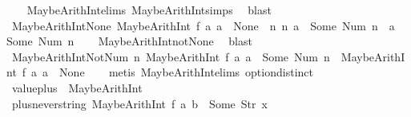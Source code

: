 \begin{isabellebody}
%
\isadelimproof
\ \ %
\endisadelimproof
%
\isatagproof
{}\isamarkupfalse%
\ MaybeArithInt{\isachardot}elims\ MaybeArithInt{\isachardot}simps{\isacharparenleft}{}{\isacharparenright}\ \isamarkupfalse%
\ blast%
\endisatagproof
{\isafoldproof}%
%
\isadelimproof
\isanewline
%
\endisadelimproof
\isanewline
{}\isamarkupfalse%
\ MaybeArithInt{\isacharunderscore}None{\isacharcolon}\ {\isachardoublequoteopen}{\isacharparenleft}MaybeArithInt\ f\ a{}\ a{}\ {\isacharequal}\ None{\isacharparenright}\ {\isacharequal}\ {\isacharparenleft}{\isasymnexists}n\ n{\isacharprime}{\isachardot}\ a{}\ {\isacharequal}\ Some\ {\isacharparenleft}Num\ n{\isacharparenright}\ {\isasymand}\ a{}\ {\isacharequal}\ Some\ {\isacharparenleft}Num\ n{\isacharprime}{\isacharparenright}{\isacharparenright}{\isachardoublequoteclose}\isanewline
%
\isadelimproof
\ \ %
\endisadelimproof
%
\isatagproof
{}\isamarkupfalse%
\ MaybeArithInt{\isacharunderscore}not{\isacharunderscore}None\ \isamarkupfalse%
\ blast%
\endisatagproof
{\isafoldproof}%
%
\isadelimproof
\isanewline
%
\endisadelimproof
\isanewline
{}\isamarkupfalse%
\ MaybeArithInt{\isacharunderscore}Not{\isacharunderscore}Num{\isacharcolon}\ {\isachardoublequoteopen}{\isacharparenleft}{\isasymforall}n{\isachardot}\ MaybeArithInt\ f\ a{}\ a{}\ {\isasymnoteq}\ Some\ {\isacharparenleft}Num\ n{\isacharparenright}{\isacharparenright}\ {\isacharequal}\ {\isacharparenleft}MaybeArithInt\ f\ a{}\ a{}\ {\isacharequal}\ None{\isacharparenright}{\isachardoublequoteclose}\isanewline
%
\isadelimproof
\ \ %
\endisadelimproof
%
\isatagproof
{}\isamarkupfalse%
\ {\isacharparenleft}metis\ MaybeArithInt{\isachardot}elims\ option{\isachardot}distinct{\isacharparenleft}{}{\isacharparenright}{\isacharparenright}%
\endisatagproof
{\isafoldproof}%
%
\isadelimproof
\isanewline
%
\endisadelimproof
\isanewline
{}\isamarkupfalse%
\ {\isachardoublequoteopen}value{\isacharunderscore}plus\ {\isacharequal}\ MaybeArithInt\ {\isacharparenleft}{\isacharplus}{\isacharparenright}{\isachardoublequoteclose}\isanewline
\isanewline
{}\isamarkupfalse%
\ plus{\isacharunderscore}never{\isacharunderscore}string{\isacharcolon}\ {\isachardoublequoteopen}MaybeArithInt\ f\ a\ b\ {\isasymnoteq}\ Some\ {\isacharparenleft}Str\ x{\isacharparenright}{\isachardoublequoteclose}\isanewline
%
\isadelimproof
\ \ %
\endisadelimproof
%
\isatagproof

\end{isabellebody}
